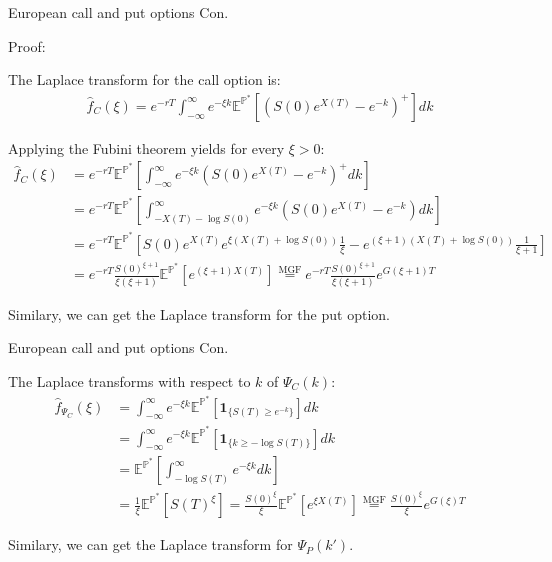 \documentclass{beamer}
\begin{document}
\begin{frame}{European call and put options Con.}

    {\footnotesize \scriptsize
    \par Proof:
    \par The Laplace transform for the call option is:
    \begin{align*}
        \hat{f}_C(\xi) = e^{-rT} \int_{-\infty}^{\infty} e^{-\xi k} \mathbb{E}^{\mathbb{P}^*} \left[ (S(0)e^{X(T)} - e^{-k})^+ \right]  dk
    \end{align*}
    \par  \pause Applying the Fubini theorem yields for every \(\xi > 0\):
    \begin{align*}
        \hat{f}_C(\xi) &= e^{-rT} \mathbb{E}^{\mathbb{P}^*} \left[ \int_{-\infty}^{\infty} e^{-\xi k} \left( S(0)e^{X(T)} - e^{-k} \right)^+  dk \right]\\
        &= e^{-rT} \mathbb{E}^{\mathbb{P}^*} \left[ \int_{-X(T)-\log S(0)}^{\infty} e^{-\xi k} \left( S(0)e^{X(T)} - e^{-k} \right)  dk \right]\\
        &= e^{-rT} \mathbb{E}^{\mathbb{P}^*} \left[ S(0)e^{X(T)} e^{\xi (X(T)+\log S(0))} \frac{1}{\xi} - e^{(\xi+1)(X(T)+\log S(0))} \frac{1}{\xi+1} \right]\\
        &= e^{-rT} \frac{S(0)^{\xi+1}}{\xi (\xi+1)} \mathbb{E}^{\mathbb{P}^*} \left[ e^{(\xi+1)X(T)} \right] \overset{\text{MGF}}{=}
          e^{-rT} \frac{S(0)^{\xi+1}}{\xi (\xi+1)} e^{G(\xi+1)T}
    \end{align*}
    
    \par Similary, we can get the  Laplace transform for the put option. 
    }
    
\end{frame}
\begin{frame}{European call and put options Con.}

    {\footnotesize \footnotesize
    \par  The Laplace transforms with respect to \( k \) of \( \Psi_C(k) \):
    \begin{align*}
        \hat{f}_{\Psi_C}(\xi) &= \int_{-\infty}^{\infty} e^{-\xi k} \mathbb{E}^ {\mathbb{P}^*} \left[ \mathbf{1}_{\{S(T) \geq e^{-k}\}} \right]  dk \\
       &  = \int_{-\infty}^{\infty} e^{-\xi k} \mathbb{E}^{\mathbb{P}^*} \left[ \mathbf{1}_{\{k \geq -\log S(T)\}} \right]  dk\\
       & =\mathbb{E}^{\mathbb{P}^*} \left[ \int_{-\log S(T)}^{\infty} e^{-\xi k}  dk \right] \\
       &= \frac{1}{\xi} \mathbb{E}^{\mathbb{P}^*} \left[ S(T)^{\xi} \right] = 
       \frac{S(0)^{\xi}}{\xi} \mathbb{E}^{\mathbb{P}^*} \left[ e^{\xi X(T)} \right] \overset{\text{MGF}}{=} \frac{S(0)^{\xi}}{\xi} e^{G(\xi)T}
    \end{align*}
    \par Similary, we can get the  Laplace transform for $\Psi_P(k')$. 
    }
    
\end{frame}
\end{document}

